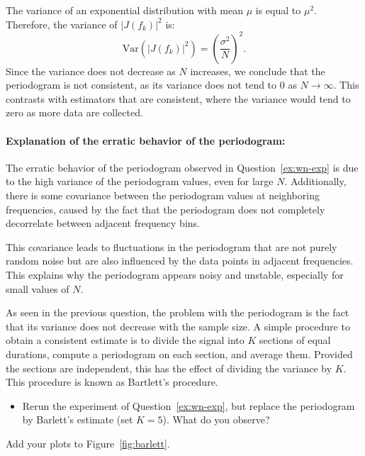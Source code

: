 \documentclass[11pt]{article}
\begin{document}
\begin{solution}
    The variance of an exponential distribution with mean \(\mu\) is equal to \(\mu^2\). Therefore, the variance of \( |J(f_k)|^2 \) is:
    \[
    \text{Var}(|J(f_k)|^2) = \left( \frac{\sigma^2}{N} \right)^2.
    \]
    Since the variance does not decrease as \(N\) increases, we conclude that the periodogram is not consistent, as its variance does not tend to 0 as \(N \to \infty\). This contrasts with estimators that are consistent, where the variance would tend to zero as more data are collected.
    
    \paragraph{Explanation of the erratic behavior of the periodogram:}
    
    The erratic behavior of the periodogram observed in Question~\ref{ex:wn-exp} is due to the high variance of the periodogram values, even for large \(N\). Additionally, there is some covariance between the periodogram values at neighboring frequencies, caused by the fact that the periodogram does not completely decorrelate between adjacent frequency bins.
    
    This covariance leads to fluctuations in the periodogram that are not purely random noise but are also influenced by the data points in adjacent frequencies. This explains why the periodogram appears noisy and unstable, especially for small values of \(N\).
    
    \end{solution}
    

\begin{exercise}\label{q:barlett}
    As seen in the previous question, the problem with the periodogram is the fact that its variance does not decrease with the sample size.
    A simple procedure to obtain a consistent estimate is to divide the signal into $K$ sections of equal durations, compute a periodogram on each section, and average them.
    Provided the sections are independent, this has the effect of dividing the variance by $K$. 
    This procedure is known as Bartlett's procedure.
    \begin{itemize}
        \item Rerun the experiment of Question~\ref{ex:wn-exp}, but replace the periodogram by Barlett's estimate (set $K=5$). What do you observe?
    \end{itemize}
    Add your plots to Figure~\ref{fig:barlett}.
\end{exercise}
\end{document}
